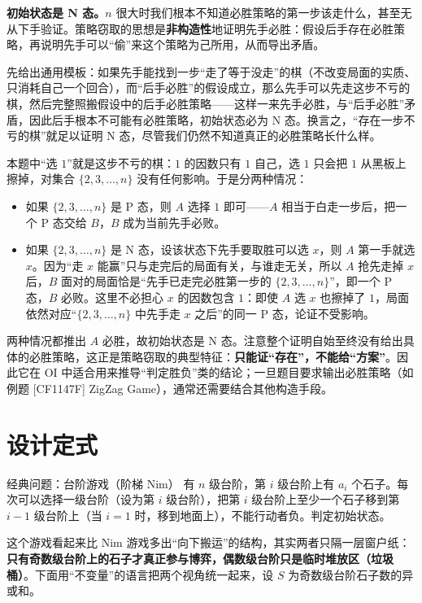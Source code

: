 \sol \textbf{初始状态是 N 态。}$n$ 很大时我们根本不知道必胜策略的第一步该走什么，甚至无从下手验证。策略窃取的思想是\textbf{非构造性}地证明先手必胜：假设后手存在必胜策略，再说明先手可以“偷”来这个策略为己所用，从而导出矛盾。

先给出通用模板：如果先手能找到一步“走了等于没走”的棋（不改变局面的实质、只消耗自己一个回合），而“后手必胜”的假设成立，那么先手可以先走这步不亏的棋，然后完整照搬假设中的后手必胜策略——这样一来先手必胜，与“后手必胜”矛盾，因此后手根本不可能有必胜策略，初始状态必为 N 态。换言之，“存在一步不亏的棋”就足以证明 N 态，尽管我们仍然不知道真正的必胜策略长什么样。

本题中“选 $1$”就是这步不亏的棋：$1$ 的因数只有 $1$ 自己，选 $1$ 只会把 $1$ 从黑板上擦掉，对集合 $\{2,3,\ldots,n\}$ 没有任何影响。于是分两种情况：
\begin{itemize}
\item 如果 $\{2,3,\ldots,n\}$ 是 P 态，则 $A$ 选择 $1$ 即可——$A$ 相当于白走一步后，把一个 P 态交给 $B$，$B$ 成为当前先手必败。
\item 如果 $\{2,3,\ldots,n\}$ 是 N 态，设该状态下先手要取胜可以选 $x$，则 $A$ 第一手就选 $x$。因为“走 $x$ 能赢”只与走完后的局面有关，与谁走无关，所以 $A$ 抢先走掉 $x$ 后，$B$ 面对的局面恰是“先手已走完必胜第一步的 $\{2,3,\ldots,n\}$”，即一个 P 态，$B$ 必败。这里不必担心 $x$ 的因数包含 $1$：即使 $A$ 选 $x$ 也擦掉了 $1$，局面依然对应“$\{2,3,\ldots,n\}$ 中先手走 $x$ 之后”的同一 P 态，论证不受影响。
\end{itemize}
两种情况都推出 $A$ 必胜，故初始状态是 N 态。注意整个证明自始至终没有给出具体的必胜策略，这正是策略窃取的典型特征：\textbf{只能证“存在”，不能给“方案”}。因此它在 OI 中适合用来推导“判定胜负”类的结论；一旦题目要求输出必胜策略（如例题 [CF1147F] ZigZag Game），通常还需要结合其他构造手段。

\section{设计定式}
\begin{problem}{经典问题：台阶游戏（阶梯 Nim）}
有 $n$ 级台阶，第 $i$ 级台阶上有 $a_i$ 个石子。每次可以选择一级台阶（设为第 $i$ 级台阶），把第 $i$ 级台阶上至少一个石子移到第 $i-1$ 级台阶上（当 $i=1$ 时，移到地面上），不能行动者负。判定初始状态。
\end{problem}

\sol 这个游戏看起来比 Nim 游戏多出“向下搬运”的结构，其实两者只隔一层窗户纸：\textbf{只有奇数级台阶上的石子才真正参与博弈，偶数级台阶只是临时堆放区（垃圾桶）}。下面用“不变量”的语言把两个视角统一起来，设 $S$ 为奇数级台阶石子数的异或和。

